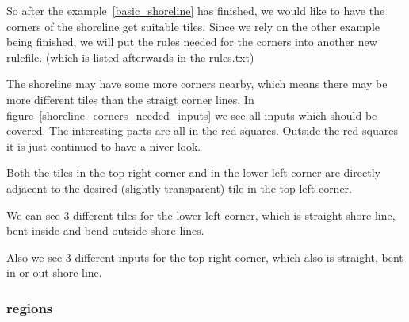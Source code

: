 So after the example~\ref{basic_shoreline} has finished, we would like to have the
corners of the shoreline get suitable tiles. Since we rely on the other example
being finished, we will put the rules needed for the corners into another new
rulefile. (which is listed afterwards in the rules.txt)

The shoreline may have some more corners nearby, which means there may be
more different tiles than the straigt corner lines. In figure~\ref{shoreline_corners_needed_inputs}
we see all inputs which should be covered.
The interesting parts are all in the red squares. Outside the red squares
it is just continued to have a niver look.

Both the tiles in the top right corner and in the lower left corner are
directly adjacent to the desired (slightly transparent) tile in the top left
corner.

We can see 3 different tiles for the lower left corner, which is
straight shore line, bent inside and bend outside shore lines.

Also we see 3 different inputs for the top right corner, which also
is straight, bent in or out shore line.

\subsubsection{regions}

